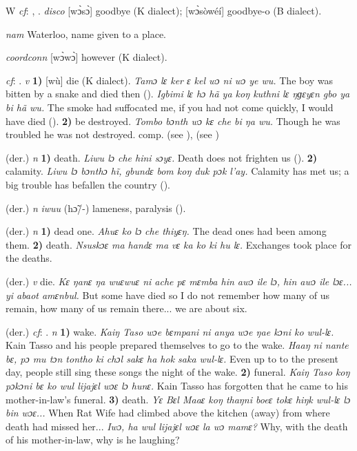 \begin{letter}{W}
 \textit{cf}: , . \textit{disco} [wɔ̀sɔ̀] goodbye (K dialect); [wɔ̀sòwéí] goodbye-o (B dialect). 

 \textit{nam} Waterloo, name given to a place.

 \textit{coordconn} [wɔ̀wɔ̀] however (K dialect). 

 \textit{cf}: . \textit{v} \textbf{1)} [wù] die (K dialect). \textit{Tamɔ lɛ ker ɛ kel wɔ ni wɔ ye wu.} The boy was bitten by a snake and died then (\citealt{Pichl1967}). \textit{Igbimi lɛ hɔ hã ya koŋ kuthni lɛ ŋɡɛyɛn gbo ya bi hã wu.} The smoke had suffocated me, if you had not come quickly, I would have died (\citealt{Pichl1967}). \textbf{2)} be destroyed. \textit{Tombo bɔnth wɔ kɛ che bi ŋa wu.} Though he was troubled he was not destroyed. comp.  (see ),  (see ) 

 (der.) \textit{n} \textbf{1)} death. \textit{Liwu lɔ che hini sɔyɛ.} Death does not frighten us (\citealt{Pichl1967}). \textbf{2)} calamity. \textit{Liwu lɔ bɔnthɔ hĩ, gbundɛ bom koŋ duk pɔk l'ay.} Calamity has met us; a big trouble has befallen the country (\citealt{Pichl1967}). 

 (der.) \textit{n} \textit{iwuu} (hɔ̃/-) lameness, paralysis (\citealt{Pichl1967}). 

 (der.) \textit{n} \textbf{1)} dead one. \textit{Ahuɛ ko lɔ che thiyɛŋ.} The dead ones had been among them. \textbf{2)} death. \textit{Nsuskɔɛ ma handɛ ma vɛ ka ko ki hu lɛ.} Exchanges took place for the deaths.

 (der.) \textit{v} die. \textit{Kɛ ŋanɛ ŋa wuɛwuɛ ni ache pɛ mɛmba hin awɔ ile lɔ, hin awɔ ile lɔɛ... yi abaot amɛnbul.} But some have died so I do not remember how many of us remain, how many of us remain there... we are about six.

 (der.) \textit{cf}: . \textit{n} \textbf{1)} wake. \textit{Kaiŋ Taso wɔe bɛmpani ni anya wɔe ŋae kɔni ko wul-lɛ.} Kain Tasso and his people prepared themselves to go to the wake. \textit{Haaŋ ni nante bɛ, pɔ mu tɔn tontho ki chɔl sakɛ ha hok saka wul-lɛ.} Even up to to the present day, people still sing these songs the night of the wake. \textbf{2)} funeral. \textit{Kaiŋ Taso koŋ pɔkɔni bɛ ko wul lijajɛl wɔɛ lɔ hunɛ.} Kain Tasso has forgotten that he came to his mother-in-law's funeral. \textbf{3)} death. \textit{Yɛ Bɛl Maaɛ koŋ thaŋni boeɛ tokɛ hiŋk wul-lɛ lɔ bin wɔɛ...} When Rat Wife had climbed above the kitchen (away) from where death had missed her... \textit{Iwɔ, ha wul lijajɛl wɔɛ la wɔ mamɛ?} Why, with the death of his mother-in-law, why is he laughing?


\end{letter}
